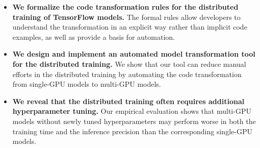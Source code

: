 \begin{itemize}
  \item {\bf We formalize the code transformation rules for the distributed
    training of TensorFlow models.} The formal rules allow developers to
    understand the transformation in an explicit way rather than implicit code
    examples, as well as provide a basis for automation. 

  \item {\bf We design and implement an automated model transformation tool for
    the distributed training.} We show that our tool can reduce manual efforts
    in the distributed training by automating the code transformation from
    single-GPU models to multi-GPU models.

  \item {\bf We reveal that the distributed training often requires additional
    hyperparameter tuning.} Our empirical evaluation shows that multi-GPU
    models without newly tuned hyperparameters may perform worse in both the
    training time and the inference precision than the corresponding single-GPU
    models.
\end{itemize}
